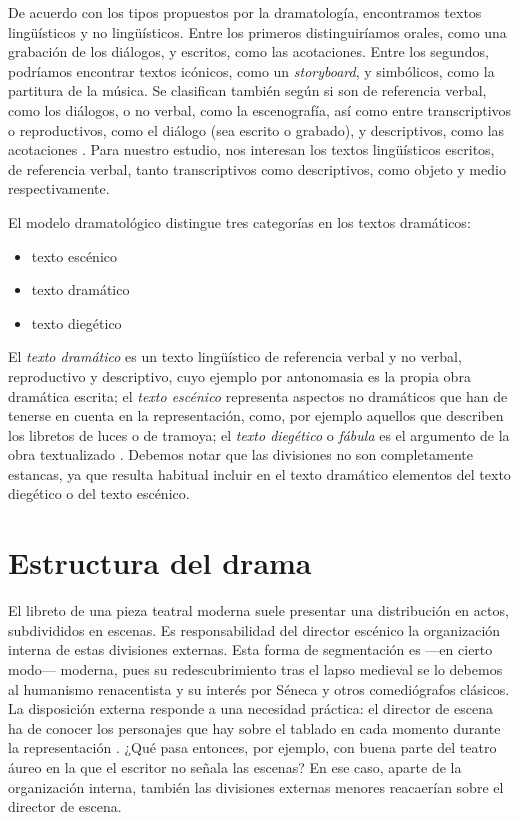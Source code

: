 De acuerdo con los tipos propuestos por la dramatología, encontramos textos lingüísticos y no lingüísticos. Entre los primeros distinguiríamos orales, como una grabación de los diálogos, y escritos, como las acotaciones. Entre los segundos, podríamos encontrar textos icónicos, como un \textit{storyboard}, y simbólicos, como la partitura de la música. Se clasifican también según si son de referencia verbal, como los diálogos, o no verbal, como la escenografía, así como entre transcriptivos o reproductivos, como el diálogo (sea escrito o grabado), y descriptivos, como las acotaciones \parencite[64]{garcia2020}. Para nuestro estudio, nos interesan los textos lingüísticos escritos, de referencia verbal, tanto transcriptivos como descriptivos, como objeto y medio respectivamente. 

El modelo dramatológico distingue tres categorías en los textos dramáticos:
\begin{itemize}
	\item texto escénico
	\item texto dramático
	\item texto diegético
\end{itemize}
El \textit{texto dramático} es un texto lingüístico de referencia verbal y no verbal, reproductivo y descriptivo, cuyo ejemplo por antonomasia es la propia obra dramática escrita; el \textit{texto escénico} representa aspectos no dramáticos que han de tenerse en cuenta en la representación, como, por ejemplo aquellos que describen los libretos de luces o de tramoya; el \textit{texto diegético} o \textit{fábula} es el argumento de la obra textualizado \parencite[65]{garcia2020}. Debemos notar que las divisiones no son completamente estancas, ya que resulta habitual incluir en el texto dramático elementos del texto diegético o del texto escénico. 

\section{Estructura del drama}
El libreto de una pieza teatral moderna suele presentar una distribución en actos, subdivididos en escenas. Es responsabilidad del director escénico la organización interna de estas divisiones externas. Esta forma de segmentación es —\nolinebreak en cierto modo\nolinebreak— moderna, pues su redescubrimiento tras el lapso medieval se lo debemos al humanismo renacentista y su interés por Séneca y otros comediógrafos clásicos. La disposición externa responde a una necesidad práctica: el director de escena ha de conocer los personajes que hay sobre el tablado en cada momento durante la representación \parencite[170]{kayser1992}. ¿Qué pasa entonces, por ejemplo, con buena parte del teatro áureo en la que el escritor no señala las escenas? En ese caso, aparte de la organización interna, también las divisiones externas menores reacaerían sobre el director de escena.


